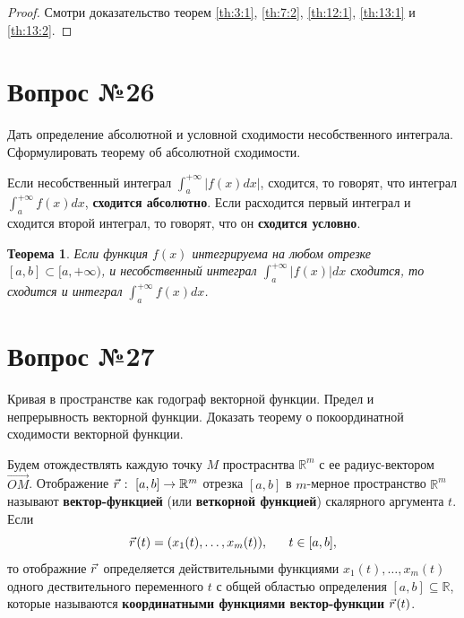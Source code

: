 \documentclass[12pt]{report}
\numberwithin{equation}{section}
\newtheorem{theorem}{Теорема}[section]
\newcommand{\pvec}[1]{\vec{#1}\mkern2mu\vphantom{#1}}
\begin{document}
\begin{proof}
Смотри доказательство теорем \ref{th:3:1}, \ref{th:7:2}, \ref{th:12:1}, \ref{th:13:1} и \ref{th:13:2}.
\end{proof}

\newpage \section{Вопрос №26} %
\begin{framed}
Дать определение абсолютной и условной сходимости несобственного интеграла. Сформулировать теорему об абсолютной сходимости.
\end{framed}
Если несобственный интеграл $\int_a^{+\infty}|f(x)dx|$, сходится, то говорят, что интеграл $\int_a^{+\infty}f(x)dx$, \textbf{сходится абсолютно}. Если расходится первый интеграл и сходится второй интеграл, то говорят, что он \textbf{сходится условно}.\\

\begin{theorem} \label{th:26:1}
Если функция $f(x)$ интегрируема на любом отрезке $[a,b] \subset [a, +\infty)$, и несобственный интеграл $\int_a^{+\infty} |f(x)|dx$ сходится, то сходится и интеграл $\int_a^{+\infty}f(x)dx$.
\end{theorem}

\newpage \section{Вопрос №27} %
\begin{framed}
Кривая в пространстве как годограф векторной функции. Предел и непрерывность векторной функции. Доказать теорему о покоординатной сходимости векторной функции.
\end{framed}
Будем отождествлять каждую точку $M$ простраснтва $\mathbb{R}^m$ с ее радиус-вектором $\overrightarrow{OM}$. Отображение $\pvec{r}:~[a,b] \to \mathbb{R}^m$ отрезка $[a,b]$ в $m$-мерное пространство $\mathbb{R}^m$ называют \textbf{вектор-функцией} (или \textbf{веткорной функцией}) скалярного аргумента $t$. Если
\begin{equation} \label{eq:27:1}
\pvec{r}(t) = (x_1(t), \ldots, x_m(t)),~~~~~ t \in [a,b],
\end{equation}
то отображние $\pvec{r}$ определяется действительными функциями $x_1(t), \ldots, x_m(t)$ одного дествительного переменного $t$ с общей областью определения $[a,b] \subseteq \mathbb{R}$, которые называются \textbf{координатными функциями вектор-функции} $\pvec{r}(t)$.\\
\end{document}
